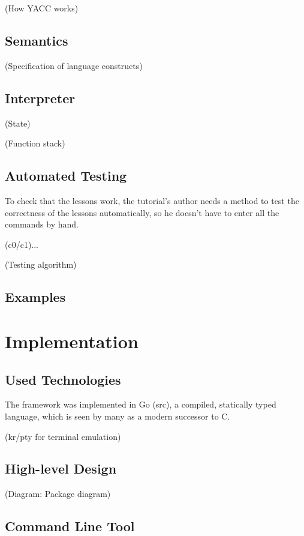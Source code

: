 \documentclass[twoside]{scrreprt}
\begin{document}
(How YACC works)

\section{Semantics}

(Specification of language constructs)

\section{Interpreter}

(State)

(Function stack)

\section{Automated Testing}

To check that the lessons work, the tutorial's author needs a method to test the correctness of the lessons automatically, so he doesn't have to enter all the commands by hand.

(c0/c1)...

(Testing algorithm)

\section{Examples}

\chapter{Implementation}

\section{Used Technologies}

The framework was implemented in Go (src), a compiled, statically typed language, which is seen by many as a modern successor to C.

(kr/pty for terminal emulation)

\section{High-level Design}

(Diagram: Package diagram)

\section{Command Line Tool}
\end{document}
